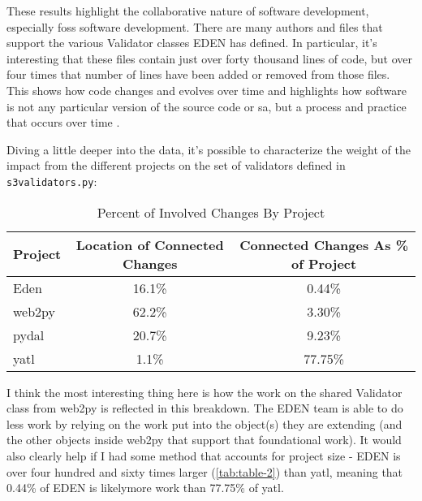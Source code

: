 \documentclass[a4paper,man,natbib,floatsintext]{apa6}
\begin{document}
  These results highlight the collaborative nature of software development, especially \acrshort{foss} software development. There are many authors and files that support the various Validator classes \gls{EDEN} has defined. In particular, it's interesting that these files contain just over forty thousand lines of code, but over four times that number of lines have been added or removed from those files. This shows how code changes and evolves over time and highlights how software is not any particular version of the source code or \gls{sa}, but a process and practice that occurs over time \citep{Mackenzie2006-hb}.  

  Diving a little deeper into the data, it's possible to characterize the weight of the impact from the different projects on the set of validators defined in \verb|s3validators.py|:

  \begin{table}[ht]
  \caption{Percent of Involved Changes By Project}
  \label{tab:change-locations}
  \begin{tabular}{|l|c|c|}
\hline
\textbf{Project} & \textbf{Location of Connected Changes} & \textbf{Connected Changes As \% of Project} \\ \hline
Eden                  & 16.1\%                                       & 0.44\%                           \\ \hline
web2py                & 62.2\%                                       & 3.30\%                           \\ \hline
pydal                 & 20.7\%                                       & 9.23\%                           \\ \hline
yatl                  & 1.1\%                                        & 77.75\%                          \\ \hline
\end{tabular}
\end{table}

  I think the most interesting thing here is how the work on the shared Validator class from web2py is reflected in this breakdown. The \gls{EDEN} team is able to do less work by relying on the work put into the object(s) they are extending (and the other objects inside web2py that support that foundational work). It would also clearly help if I had some method that accounts for project size - \gls{EDEN} is over four hundred and sixty times larger (\ref{tab:table-2}) than yatl, meaning that 0.44\% of \gls{EDEN} is likely\footnotemark more work than 77.75\% of yatl.
\end{document}
